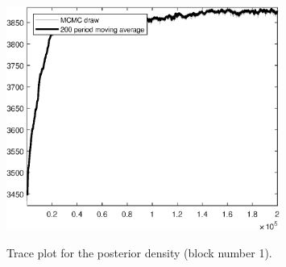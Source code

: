 \begin{figure}[H]
\centering
  \includegraphics[width=0.8\textwidth]{BRS_sectoral_rest/graphs/TracePlot_Posterior_blck_1}\\
    \caption{Trace plot for the posterior density (block number 1).}
\end{figure}
